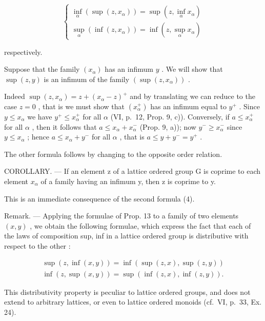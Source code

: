 \[
\left\{ \begin{array}{l} \inf _ {\alpha} (\sup (z, x _ {\alpha})) = \sup \left(z, \inf _ {\alpha} x _ {\alpha}\right) \\ \sup _ {\alpha} (\inf (z, x _ {\alpha})) = \inf \left(z, \sup _ {\alpha} x _ {\alpha}\right) \end{array} \right.\tag{4}
\]

respectively.

Suppose that the family \((x_{\alpha})\) has an infimum \(y\) . We will show that \(\sup (z,y)\) is an infimum of the family \((\sup (z,x_{\alpha}))\) .

Indeed \(\sup (z, x_{\alpha}) = z + (x_{\alpha} - z)^{+}\) and by translating we can reduce to the case \(z = 0\) , that is we must show that \((x_{\alpha}^{+})\) has an infimum equal to \(y^{+}\) . Since \(y \leqslant x_{\alpha}\) we have \(y^{+} \leqslant x_{\alpha}^{+}\) for all \(\alpha\) (VI, p.~12, Prop. 9, c)). Conversely, if \(a \leqslant x_{\alpha}^{+}\) for all \(\alpha\) , then it follows that \(a \leqslant x_{\alpha} + x_{\alpha}^{-}\) (Prop. 9, a)); now \(y^{-} \geqslant x_{\alpha}^{-}\) since \(y \leqslant x_{\alpha}\) ; hence \(a \leqslant x_{\alpha} + y^{-}\) for all \(\alpha\) , that is \(a \leqslant y + y^{-} = y^{+}\) .

The other formula follows by changing to the opposite order relation.

COROLLARY. --- If an element z of a lattice ordered group G is coprime to each element \(x_{\alpha}\) of a family having an infimum y, then z is coprime to y.

This is an immediate consequence of the second formula (4).

Remark. --- Applying the formulae of Prop. 13 to a family of two elements \((x, y)\) , we obtain the following formulae, which express the fact that each of the laws of composition sup, inf in a lattice ordered group is distributive with respect to the other :

\[
\begin{array}{l} \sup (z, \inf (x, y)) = \inf (\sup (z, x), \sup (z, y)) \\ \inf (z, \sup (x, y)) = \sup (\inf (z, x), \inf (z, y)). \end{array}
\]

This distributivity property is peculiar to lattice ordered groups, and does not extend to arbitrary lattices, or even to lattice ordered monoids (cf.~VI, p.~33, Ex. 24).
\relax{}
